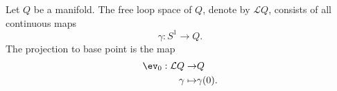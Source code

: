 
 
    Let $Q$ be a manifold. The free loop space of $Q$, denote by $\mathcal L Q$, consists of all continuous maps 
    \[\gamma:S^1\to Q.\]
    The projection to base point is the map 
    \begin{align*}
        \ev_0: \mathcal L Q\to& Q\\
        \gamma\mapsto &\gamma(0).
    \end{align*}
    \label{def:freeLoopSpace}
 